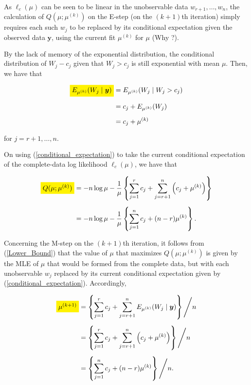 \documentclass[11pt, a4paper]{article}
\begin{document}
As $\ell_c(\mu)$ can be seen to be linear in the unobservable data
$w_{r+1},\ldots,w_n$, the calculation of
$Q(\mu;\mu^{(k)})$ on the E-step (on the $(k+1)$th iteration)
simply requires each such $w_j$ to be replaced by its conditional
expectation given the observed data $\boldsymbol{y}$, using the
current fit $\mu^{(k)}$ for $\mu$ (Why ?).

By the lack of memory of the exponential distribution,
the conditional distribution of $W_j-c_j$ given that $W_j>c_j$
is still exponential with mean $\mu$. Then, we have that

\begin{align}
\colorbox{yellow}{$E_{\mu^{(k)}}(W_j \mid \boldsymbol{y})$}
&=
E_{\mu^{(k)}}(W_j \mid W_j>c_j) \nonumber \\[0.5em]
&=
c_j + E_{\mu^{(k)}}(W_j) \nonumber \\[0.5em]
&=
c_j + \mu^{(k)} \label{conditional_expectation}
\end{align}

for $j=r+1,\ldots,n$.

On using (\ref{conditional_expectation}) to take the current conditional expectation of the complete-data log likelihood $\ell_c(\mu)$, we have that

\begin{align}
\colorbox{yellow}{$Q(\mu;\mu^{(k)})$}
&=
-n \log \mu
-
\dfrac{1}{\mu}
\left\{
\sum \limits_{j=1}^{r} c_j
+
\sum \limits_{j=r+1}^{n}
\left(c_j+\mu^{(k)}\right)
\right\}  \nonumber \\[0.5em]
&=
-n \log \mu
-
\dfrac{1}{\mu}
\left\{
\sum \limits_{j=1}^{n} c_j
+
(n-r)\mu^{(k)}
\right\}. \label{Lower_Bound}
\end{align}

Concerning the M-step on the $(k+1)$th iteration, it follows from
(\ref{Lower_Bound}) that the value of $\mu$ that maximizes
$Q(\mu;\mu^{(k)})$ is given by the MLE of $\mu$ that would be formed
from the complete data, but with each unobservable $w_j$ replaced by its
current conditional expectation given by (\ref{conditional_expectation}). Accordingly,

\begin{align*}
\colorbox{yellow}{$\mu^{(k+1)}$}
&=
\left\{
\sum \limits_{j=1}^{r} c_j
+
\sum \limits_{j=r+1}^{n}
E_{\mu^{(k)}}(W_j \mid \boldsymbol{y})
\right\}
\Bigg/n
\\[1.2ex]
&=
\left\{
\sum \limits_{j=1}^{r} c_j
+
\sum \limits_{j=r+1}^{n}
\left(c_j+\mu^{(k)}\right)
\right\}
\Bigg/n
\\[1.2ex]
&=
\left\{
\sum \limits_{j=1}^{n} c_j
+
(n-r)\mu^{(k)}
\right\}
\Bigg/n.
\end{align*}
\end{document}
